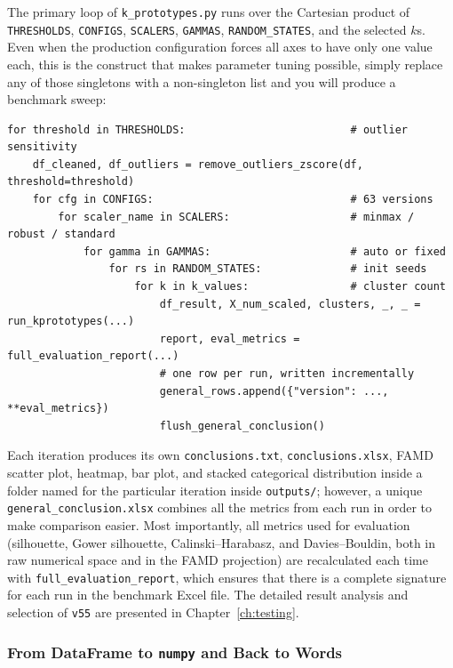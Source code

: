 The primary loop of \texttt{k\_prototypes.py} runs over the Cartesian product of \texttt{THRESHOLDS}, \texttt{CONFIGS}, \texttt{SCALERS}, \texttt{GAMMAS}, \texttt{RANDOM\_STATES}, and the selected \(k\)s. Even when the production configuration forces all axes to have only one value each, this is the construct that makes parameter tuning possible, simply replace any of those singletons with a non-singleton list and you will produce a benchmark sweep:

\begin{lstlisting}[style=pythonstyle]
for threshold in THRESHOLDS:                          # outlier sensitivity
    df_cleaned, df_outliers = remove_outliers_zscore(df, threshold=threshold)
    for cfg in CONFIGS:                               # 63 versions
        for scaler_name in SCALERS:                   # minmax / robust / standard
            for gamma in GAMMAS:                      # auto or fixed
                for rs in RANDOM_STATES:              # init seeds
                    for k in k_values:                # cluster count
                        df_result, X_num_scaled, clusters, _, _ = run_kprototypes(...)
                        report, eval_metrics = full_evaluation_report(...)
                        # one row per run, written incrementally
                        general_rows.append({"version": ..., **eval_metrics})
                        flush_general_conclusion()
\end{lstlisting}

\noindent Each iteration produces its own \texttt{conclusions.txt}, \texttt{conclusions.xlsx}, FAMD scatter plot, heatmap, bar plot, and stacked categorical distribution inside a folder named for the particular iteration inside \texttt{outputs/}; however, a unique \texttt{general\_conclusion.xlsx} combines all the metrics from each run in order to make comparison easier. Most importantly, all metrics used for evaluation (silhouette, Gower silhouette, Calinski--Harabasz, and Davies--Bouldin, both in raw numerical space and in the FAMD projection) are recalculated each time with \texttt{full\_evaluation\_report}, which ensures that there is a complete signature for each run in the benchmark Excel file. The detailed result analysis and selection of \texttt{v55} are presented in Chapter~\ref{ch:testing}.

\subsubsection*{From DataFrame to \texttt{numpy} and Back to Words}

